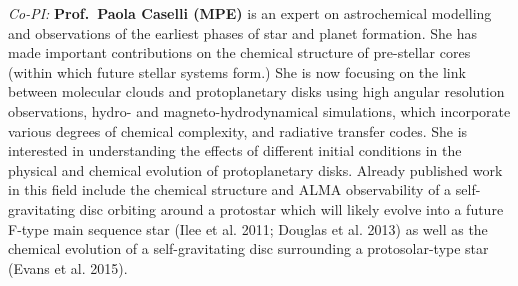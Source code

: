\documentclass[10pt,fleqn,twoside]{article}
\begin{document}
{\it Co-PI:} {\bf Prof.\ Paola Caselli (MPE)} 
is an expert on astrochemical
modelling and observations of the earliest phases of star and planet
formation. She has made important contributions on the chemical structure
of pre-stellar cores (within which future stellar systems form.)
She is
now focusing on the link between molecular clouds and protoplanetary
disks using high angular resolution observations, hydro- and
magneto-hydrodynamical simulations, which incorporate various degrees
of chemical complexity, and radiative transfer codes. She is
interested in understanding the effects of different initial
conditions in the physical and chemical evolution of protoplanetary
disks. Already published work in this field include the chemical
structure and ALMA observability of a self-gravitating disc orbiting
around a protostar which will likely evolve into a future F-type main
sequence star (Ilee et al. 2011; Douglas et al. 2013) as well as the
chemical evolution of a self-gravitating disc surrounding a
protosolar-type star (Evans et al. 2015). 
\end{document}
